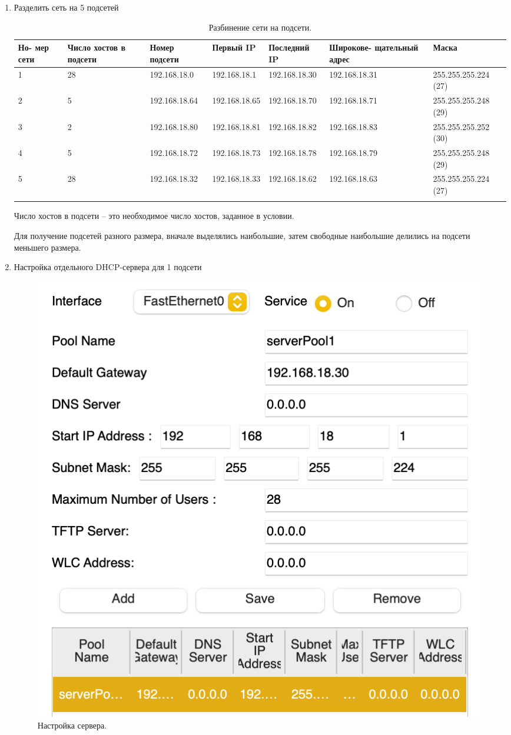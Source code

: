 \documentclass[a4paper,14pt]{extreport} %
\begin{document}
\begin{enumerate}

\item Разделить сеть на 5 подсетей

\begin{longtable}{|m{0.8cm}|m{1.3cm}|m{2.6cm}|m{2.6cm}|m{2.6cm}|m{2.6cm}|m{3.1cm}|}
\hline
Но- мер сети & Число хостов в подсети & Номер подсети & Первый IP & Последний IP & Широкове- щательный адрес  & Маска  \\ \hline
1 &28 & 192.168.18.0 & 192.168.18.1 & 192.168.18.30 & 192.168.18.31  & 255.255.255.224 (27)  \\ \hline
2 &5 & 192.168.18.64 & 192.168.18.65 & 192.168.18.70 & 192.168.18.71  & 255.255.255.248 (29)  \\ \hline
3 &2 & 192.168.18.80 & 192.168.18.81 & 192.168.18.82 & 192.168.18.83  & 255.255.255.252 (30)  \\ \hline
4 &5 & 192.168.18.72 & 192.168.18.73 & 192.168.18.78 & 192.168.18.79  & 255.255.255.248 (29)  \\ \hline
5 &28 & 192.168.18.32 & 192.168.18.33 & 192.168.18.62 & 192.168.18.63  & 255.255.255.224 (27)  \\ \hline
\caption{Разбинение сети на подсети. }
\label{table:1}
\end{longtable}

Число хостов в подсети -- это необходимое число хостов, заданное в условии. 

Для получение подсетей разного размера, вначале выделялись наибольшие, затем свободные наибольшие делились на подсети меньшего размера.

\newpage 

\item Настройка отдельного DHCP-сервера для 1 подсети

\begin{figure}[H]
  \centering
  \includegraphics[scale=0.7]{1}
  \caption{Настройка сервера. }
\end{figure}


\end{enumerate}
\end{document}
